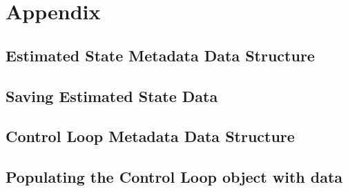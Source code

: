 \documentclass{article}
\begin{document}
\section{Appendix}\label{appendix}
\subsection{Estimated State Metadata Data Structure}\label{EstStateDS}

\newpage
\subsection{Saving Estimated State Data}\label{SaveESD}


\subsection{Control Loop Metadata Data Structure}\label{ControlLoopDS}


\subsection{Populating the Control Loop object with data}\label{ControlLoopPop}



% 
\end{document}
